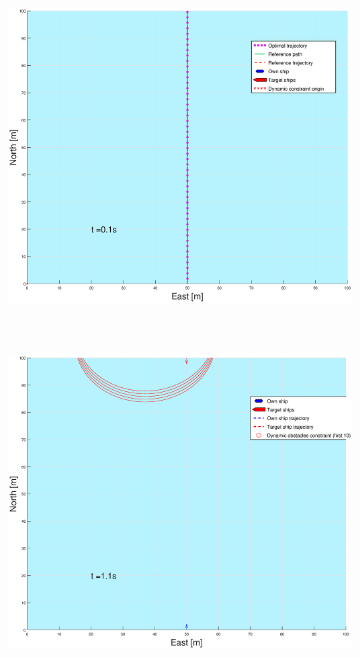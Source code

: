 \begin{figure}[!b]
\begin{subfigure}[b]{0.499\textwidth}
        \includegraphics[width=\textwidth]{Images/Figures/enkel_HO/_Simple_0fig999_time=0}
    \end{subfigure}
    \hfill
    \\
    \begin{subfigure}[b]{0.49\textwidth}
        \centering
        \includegraphics[width=\textwidth]{Images/Figures/enkel_HO/_Simple_0fig1_time=1}
    \end{subfigure}

\end{figure}
